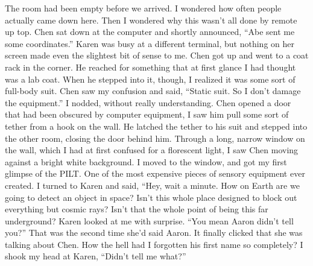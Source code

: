 \documentclass[a4paper]{article}
\begin{document}
The room had been empty before we arrived. I wondered how often people actually came down here. Then I wondered why this wasn’t all done by remote up top. Chen sat down at the computer and shortly announced, “Abe sent me some coordinates.”
Karen was busy at a different terminal, but nothing on her screen made even the slightest bit of sense to me. Chen got up and went to a coat rack in the corner. He reached for something that at first glance I had thought was a lab coat. When he stepped into it, though, I realized it was some sort of full-body suit.
Chen saw my confusion and said, “Static suit. So I don’t damage the equipment.”
I nodded, without really understanding.
Chen opened a door that had been obscured by computer equipment, I saw him pull some sort of tether from a hook on the wall. He latched the tether to his suit and stepped into the other room, closing the door behind him. Through a long, narrow window on the wall, which I had at first confused for a florescent light, I saw Chen moving against a bright white background.
I moved to the window, and got my first glimpse of the PILT. One of the most expensive pieces of sensory equipment ever created. I turned to Karen and said, “Hey, wait a minute. How on Earth are we going to detect an object in space? Isn’t this whole place designed to block out everything but cosmic rays? Isn’t that the whole point of being this far underground?
Karen looked at me with surprise. “You mean Aaron didn’t tell you?”
That was the second time she’d said Aaron. It finally clicked that she was talking about Chen. How the hell had I forgotten his first name so completely? I shook my head at Karen, “Didn’t tell me what?”
\end{document}
